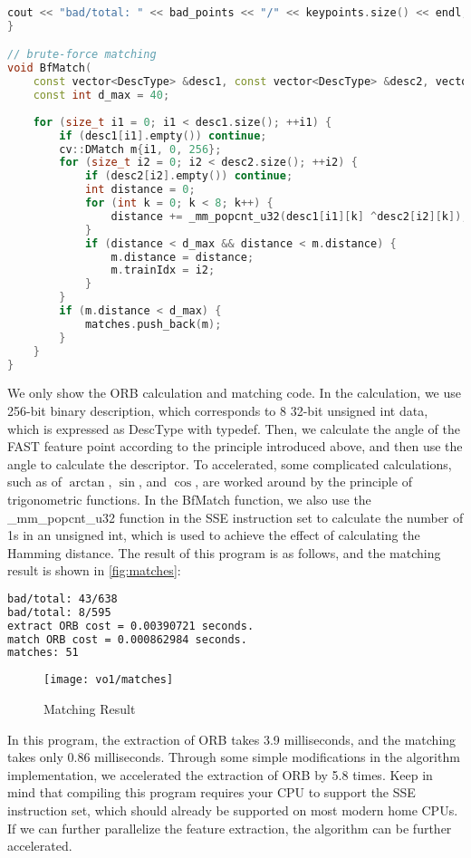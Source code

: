\begin{lstlisting}[language=c++,caption=slambook2/ch7/orb_self.cpp（片段）]
    cout << "bad/total: " << bad_points << "/" << keypoints.size() << endl;
}

// brute-force matching
void BfMatch(
    const vector<DescType> &desc1, const vector<DescType> &desc2, vector<cv::DMatch> &matches) {
    const int d_max = 40;
    
    for (size_t i1 = 0; i1 < desc1.size(); ++i1) {
        if (desc1[i1].empty()) continue;
        cv::DMatch m{i1, 0, 256};
        for (size_t i2 = 0; i2 < desc2.size(); ++i2) {
            if (desc2[i2].empty()) continue;
            int distance = 0;
            for (int k = 0; k < 8; k++) {
                distance += _mm_popcnt_u32(desc1[i1][k] ^desc2[i2][k]);
            }
            if (distance < d_max && distance < m.distance) {
                m.distance = distance;
                m.trainIdx = i2;
            }
        }
        if (m.distance < d_max) {
            matches.push_back(m);
        }
    }
}
\end{lstlisting}
We only show the ORB calculation and matching code. In the calculation, we use 256-bit binary description, which corresponds to 8 32-bit unsigned int data, which is expressed as DescType with typedef. Then, we calculate the angle of the FAST feature point according to the principle introduced above, and then use the angle to calculate the descriptor. To accelerated, some complicated calculations, such as of $\arctan$, $\sin$, and $\cos$, are worked around by the principle of trigonometric functions. In the BfMatch function, we also use the \_mm\_popcnt\_u32 function in the SSE instruction set to calculate the number of 1s in an unsigned int, which is used to achieve the effect of calculating the Hamming distance. The result of this program is as follows, and the matching result is shown in \autoref{fig:matches}:

\begin{lstlisting}[language=sh,caption=终端输出：]
bad/total: 43/638
bad/total: 8/595
extract ORB cost = 0.00390721 seconds.
match ORB cost = 0.000862984 seconds.
matches: 51
\end{lstlisting}

\begin{figure}[!htp]
    \centering
    \texttt{[image: vo1/matches]}
    \caption{Matching Result}
    \label{fig:matches}
\end{figure}

In this program, the extraction of ORB takes 3.9 milliseconds, and the matching takes only 0.86 milliseconds. Through some simple modifications in the algorithm implementation, we accelerated the extraction of ORB by 5.8 times. Keep in mind that compiling this program requires your CPU to support the SSE instruction set, which should already be supported on most modern home CPUs. If we can further parallelize the feature extraction, the algorithm can be further accelerated.

